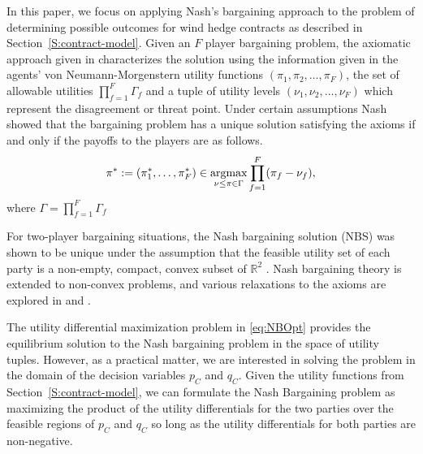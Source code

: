 In this paper, we focus on applying Nash's bargaining approach to the problem of
determining possible outcomes for wind hedge contracts
as described in Section~\ref{S:contract-model}. Given an $F$ player bargaining
problem, the axiomatic approach given in \cite{nash_two-person_1953}
characterizes the solution using the information given in the agents'
von Neumann-Morgenstern utility functions $(\pi_1, \pi_2, \ldots, \pi_F)$, the
set of allowable utilities $\prod_{f=1}^F\Gamma_f$ and a tuple of utility levels
$(\nu_1, \nu_2, \ldots, \nu_F)$ which represent the disagreement or threat
point. Under certain assumptions Nash showed that the bargaining problem has a
unique solution satisfying the axioms if and only if the payoffs to the players
are as follows.
\vspace*{-6pt}
\begin{equation}\label{eq:NBOpt}
\pi^* := (\pi_1^*, \ldots, \pi_F^*)\in \amax_{\nu \leq \pi\in \Gamma} \prod_{f=1}^F(\pi_f - \nu_f), \vspace*{-6pt}
\end{equation}
where $\Gamma=\displaystyle \prod_{f=1}^F\Gamma_f$ 

For two-player bargaining situations, the Nash bargaining solution (NBS) was
shown to be unique under the assumption that the feasible utility set of each
party is a non-empty, compact, convex subset of $\mathbb{R}^2$
\citep{nash_bargaining_1950, nash_two-person_1953}. Nash bargaining theory is
extended to non-convex problems, and various relaxations to the axioms are
explored in \cite{herrero_nash_1989, zhou_nash_1997} and \cite{mariotti_extending_1998}.

The utility differential maximization problem in \eqref{eq:NBOpt} provides the
equilibrium solution to the Nash bargaining problem in the space of utility
tuples. However, as a practical matter, we are interested in solving the problem
in the domain of the decision variables $p_C$ and $q_C$. Given the utility functions
from Section~\ref{S:contract-model}, we can formulate the Nash Bargaining
problem as maximizing the product of the utility differentials for the two
parties over the feasible regions of $p_C$ and $q_C$ so long as the
utility differentials for both parties are non-negative.

